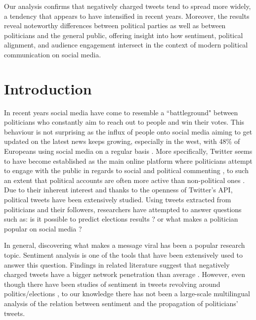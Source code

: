 Our analysis confirms that negatively charged tweets tend to spread more widely, a tendency that appears to have intensified in recent years. Moreover, the results reveal noteworthy differences between political parties as well as between politicians and the general public, offering insight into how sentiment, political alignment, and audience engagement intersect in the context of modern political communication on social media.


\section{Introduction}

In recent years social media have come to resemble a ``battleground" between politicians who constantly aim to reach out to people and win their votes. This behaviour is not surprising as the influx of people onto social media aiming to get updated on the latest news keeps growing, especially in the west, with 48\% of Europeans using social media on a regular basis \cite{cattaneo_2020}. More specifically, Twitter seems to have become established as the main online platform where politicians attempt to engage with the public in regards to social and political commenting \cite{stier2018election}, to such an extent that political accounts are often more active than non-political ones \cite{grant2010digital}. Due to their inherent interest and thanks to the openness of Twitter's \ac{API}, political tweets have been extensively studied. Using tweets extracted from politicians and their followers, researchers have attempted to answer questions such as: is it possible to predict elections results \cite{tumasjan2010predicting}? or what makes a politician popular on social media \cite{vaccari2013drives}? 

In general, discovering what makes a message viral has been a popular research topic. Sentiment analysis is one of the tools that have been extensively used to answer this question. Findings in related literature suggest that negatively charged tweets have a bigger network penetration than average \cite{tsugawa2017relation,naveed2011bad,jimenez2021sentiments}. However, even though there have been studies of sentiment in tweets revolving around politics/elections \cite{chung2011can,parmelee2011politics,llewellyn2016brexit}, to our knowledge there has not been a large-scale multilingual analysis of the relation between sentiment and the propagation of politicians' tweets.

